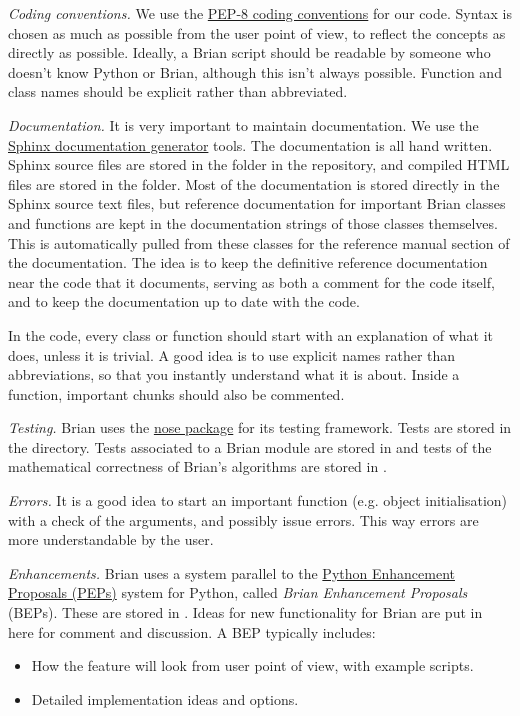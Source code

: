 \documentclass[letterpaper,10pt,english]{manual}
\begin{document}
\emph{Coding conventions.}
We use the \href{http://www.python.org/dev/peps/pep-0008/}{PEP-8 coding conventions}
for our code. Syntax is chosen as much as possible from the user point of view,
to reflect the concepts as directly as possible. Ideally, a Brian script
should be readable by someone who doesn't know Python or Brian, although this
isn't always possible. Function and class names should be explicit rather
than abbreviated.

\emph{Documentation.}
It is very important to maintain documentation. We use the
\href{http://sphinx.pocoo.org/}{Sphinx documentation generator} tools. The
documentation is all hand written. Sphinx source files are stored in the
 folder in the repository, and compiled HTML files are stored in
the  folder. Most of the documentation is stored directly in the Sphinx
source text files, but reference documentation for important Brian classes and
functions are kept in the documentation strings of those classes themselves.
This is automatically pulled from these classes for the reference manual
section of the documentation. The idea is to keep the definitive reference
documentation near the code that it documents, serving as both a comment for
the code itself, and to keep the documentation up to date with the code.

In the code, every class or function should start with an explanation of what it does,
unless it is trivial. A good idea is to use explicit names rather than abbreviations,
so that you instantly understand what it is about. Inside a function, important chunks
should also be commented.

\emph{Testing.}
Brian uses the \href{http://somethingaboutorange.com/mrl/projects/nose/0.11.1/}{nose package}
for its testing framework. Tests are stored in the  directory.
Tests associated to a Brian module are stored in 
and tests of the mathematical correctness of Brian's algorithms are stored in
.

\emph{Errors.}
It is a good idea to start an important function (e.g. object initialisation)
with a check of the arguments, and possibly issue errors. This way errors are
more understandable by the user.

\emph{Enhancements.}
Brian uses a system parallel to the
\href{http://www.python.org/dev/peps/}{Python Enhancement Proposals (PEPs)} system
for Python, called \emph{Brian Enhancement Proposals} (BEPs). These are stored in
. Ideas for new functionality for Brian are put in here for comment
and discussion. A BEP typically includes:
\begin{itemize}
\item {} 
How the feature will look from user point of view, with example scripts.

\item {} 
Detailed implementation ideas and options.

\end{itemize}
\end{document}
